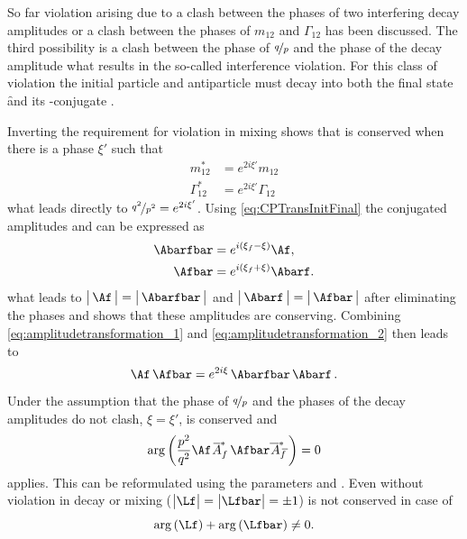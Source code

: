 So far \CP violation arising due to a clash between the phases of two interfering decay amplitudes or a clash between the phases of $m_{12}$ and $\Gamma_{12}$ has been discussed.
The third possibility is a clash between the phase of $\nicefrac{q}{p}$ and the phase of the decay amplitude what results in the so-called interference \CP violation.
For this class of \CP violation the initial particle \Paz and antiparticle \Pazb must decay into both the final state \f and its \CP-conjugate \fbar.

Inverting the requirement for \CP violation in mixing shows that \CP is conserved when there is a phase $\xi'$ such that
\begin{equation}
\begin{split}
m_{12}^\ast &= e^{2i\xi'}m_{12}\\
\Gamma_{12}^\ast &= e^{2i\xi'}\Gamma_{12}\label{eq:CPconservationMixing}
\end{split}
\end{equation}
what leads directly to $\nicefrac{q^2}{p^2} = e^{2i\xi'}$.
Using \cref{eq:CPTransInitFinal} the \CP conjugated amplitudes \Abarfbar and \Afbar can be expressed as
\begin{align}
\Abarfbar&=e^{i\left(\xi_f-\xi\right)}\Af,\label{eq:amplitudetransformation_1}\\
\Afbar&=e^{i\left(\xi_f+\xi\right)}\Abarf.\label{eq:amplitudetransformation_2}
\end{align}
what leads to $\big|\,\Af\,\big|=\big|\,\Abarfbar\,\big|$ and $\big|\,\Abarf\,\big|=\big|\,\Afbar\,\big|$ after eliminating the phases and shows that these amplitudes are \CP conserving.
Combining \cref{eq:amplitudetransformation_1} and \cref{eq:amplitudetransformation_2} then leads to
\begin{equation}
\Af\,\Afbar=e^{2i\xi}\,\Abarfbar\,\Abarf\,.
\end{equation}
Under the assumption that the phase of $\nicefrac{q}{p}$ and the phases of the decay amplitudes do not clash, \ie $\xi=\xi'$, \CP is conserved and
\begin{equation}
\arg\left(\frac{p^2}{q^2}\Af \,\overline{\kern -1.0pt A\kern -1.0pt}_{\kern 1.0pt f}^\ast\,\Afbar\overline{\kern -1.0pt \,A\kern -1.0pt}_{\kern 2.5pt\overline{\kern -1.5pt f\kern 1.5pt}}^\ast\right)=0
\end{equation}
applies.
This can be reformulated using the parameters \Lf and \Lfbar.
Even without \CP violation in decay or mixing ($\big|\Lf\big|=\big|\Lfbar\big| = \pm1$) \CP is not conserved in case of
\begin{equation}
	\arg\left(\Lf\right)+\arg\left(\Lfbar\right)\neq0. \label{eq:conditionCPV}
\end{equation}
